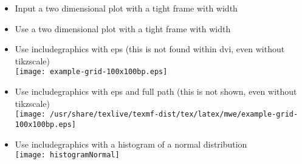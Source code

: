 \documentclass[twocolumn]{article}
\begin{document}
\begin{itemize}
			\item Input a two dimensional plot with a tight frame with width \newlength{\mylen}\settowidth{\mylen}{\frame{}}\the\mylen\\%
				\frame{}
			\item Use a two dimensional plot with a tight frame with width \the\mylen\\%
		\else
			\item Use includegraphics with eps (this is not found within dvi, even without tikzscale)\\%
				\texttt{[image: example-grid-100x100bp.eps]}%
			\item Use includegraphics with eps and full path (this is not shown, even without tikzscale)\\%
				\texttt{[image: /usr/share/texlive/texmf-dist/tex/latex/mwe/example-grid-100x100bp.eps]}%
		\fi
		\item Use includegraphics with a histogram of a normal distribution\\%
			\texttt{[image: histogramNormal]}%
	\end{itemize}
\end{document}
